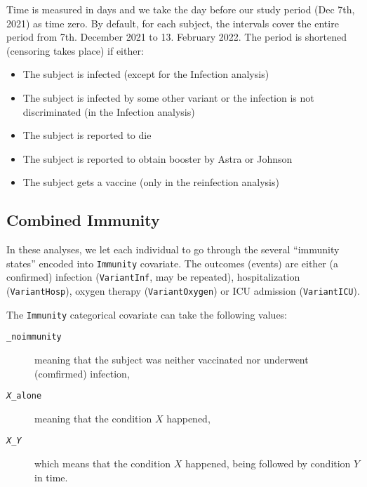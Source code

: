 \documentclass[9pt,onecolumn,twoside,lineno]{article}
\begin{document}
Time is measured in days and we take the day before our study period (Dec 7th, 2021) as time zero. By default, for each subject, the intervals cover the entire period from 7th. December 2021 to 13. February 2022. The period is shortened (censoring takes place) if either:
\begin{itemize} 
\item The subject is infected (except for the Infection analysis)
\item The subject is infected by some other variant or the infection is not discriminated (in the Infection analysis)
\item The subject is reported to die
\item The subject is reported to obtain booster by Astra or Johnson
\item The subject gets a vaccine (only in the reinfection analysis)
\end{itemize}


\subsection*{Combined Immunity}
In these analyses,
we let each individual to go through the several ``immunity states'' encoded into {\tt Immunity} covariate. The outcomes (events) are either (a confirmed) infection ({\tt VariantInf}, may be repeated), hospitalization ({\tt VariantHosp}), oxygen therapy ({\tt VariantOxygen}) or ICU admission ({\tt VariantICU}).

The {\tt Immunity} categorical covariate can take the following values:
\begin{description}
\item[{\tt \_noimmunity}] meaning that the subject was neither vaccinated nor underwent (comfirmed) infection,
\item[{\tt {\em X}\_alone}] meaning that the condition $X$ happened,
\item[{\tt {\em X}\_{\em Y}}] which means that the condition $X$ happened, being followed by condition $Y$ in time. 
\end{description}
\end{document}
